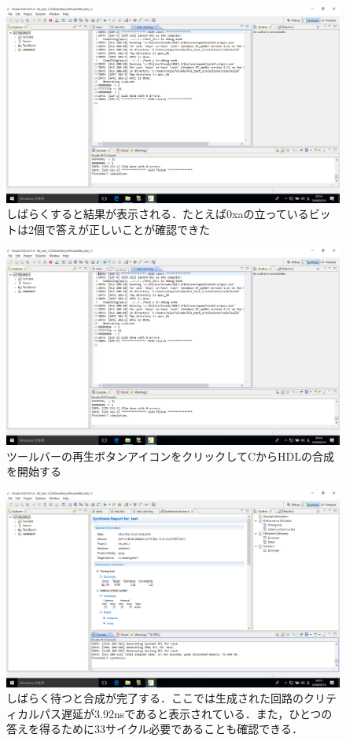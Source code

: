 \documentclass[a4paper,dvipdfmx]{jsarticle}
\begin{document}
 \begin{figure}[H]
  \begin{center}
   \includegraphics[width=.8\textwidth]{chapter08_figures/VirtualBox_Windows10_19_03_2018_23_17_17.png}
  \end{center}
  \caption{しばらくすると結果が表示される．たとえば0xaの立っているビットは2個で答えが正しいことが確認できた}
 \end{figure}

 \begin{figure}[H]
  \begin{center}
   \includegraphics[width=.8\textwidth]{chapter08_figures/VirtualBox_Windows10_19_03_2018_23_17_41.png}
  \end{center}
  \caption{ツールバーの再生ボタンアイコンをクリックしてCからHDLの合成を開始する}
 \end{figure}

 \begin{figure}[H]
  \begin{center}
   \includegraphics[width=.8\textwidth]{chapter08_figures/VirtualBox_Windows10_19_03_2018_23_18_16.png}
  \end{center}
  \caption{しばらく待つと合成が完了する．ここでは生成された回路のクリティカルパス遅延が3.92nsであると表示されている．また，ひとつの答えを得るために33サイクル必要であることも確認できる．}
 \end{figure}
\end{document}
